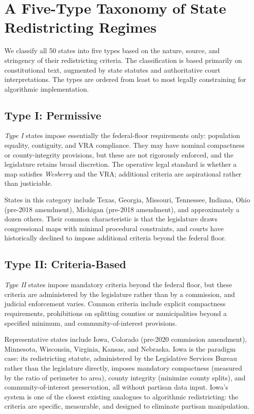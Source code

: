 \section{A Five-Type Taxonomy of State Redistricting Regimes}
\label{sec:classification}

We classify all 50 states into five types based on the nature, source, and stringency of their redistricting criteria. The classification is based primarily on constitutional text, augmented by state statutes and authoritative court interpretations. The types are ordered from least to most legally constraining for algorithmic implementation.

\subsection{Type I: Permissive}

\textit{Type I} states impose essentially the federal-floor requirements only: population equality, contiguity, and VRA compliance. They may have nominal compactness or county-integrity provisions, but these are not rigorously enforced, and the legislature retains broad discretion. The operative legal standard is whether a map satisfies \textit{Wesberry} and the VRA; additional criteria are aspirational rather than justiciable.

States in this category include Texas, Georgia, Missouri, Tennessee, Indiana, Ohio (pre-2018 amendment), Michigan (pre-2018 amendment), and approximately a dozen others. Their common characteristic is that the legislature draws congressional maps with minimal procedural constraints, and courts have historically declined to impose additional criteria beyond the federal floor.

\subsection{Type II: Criteria-Based}

\textit{Type II} states impose mandatory criteria beyond the federal floor, but these criteria are administered by the legislature rather than by a commission, and judicial enforcement varies. Common criteria include explicit compactness requirements, prohibitions on splitting counties or municipalities beyond a specified minimum, and community-of-interest provisions.

Representative states include Iowa, Colorado (pre-2020 commission amendment), Minnesota, Wisconsin, Virginia, Kansas, and Nebraska. Iowa is the paradigm case: its redistricting statute, administered by the Legislative Services Bureau rather than the legislature directly, imposes mandatory compactness (measured by the ratio of perimeter to area), county integrity (minimize county splits), and community-of-interest preservation, all without partisan data input. Iowa's system is one of the closest existing analogues to algorithmic redistricting: the criteria are specific, measurable, and designed to eliminate partisan manipulation.

